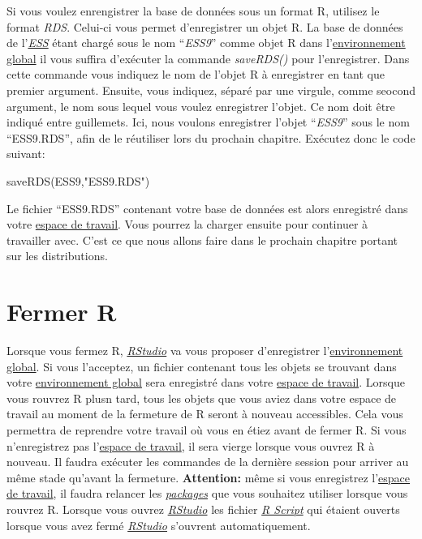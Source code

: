 \documentclass[
]{book}
\newenvironment{Shaded}{\begin{snugshade}}{\end{snugshade}}
\newcommand{\FunctionTok}[1]{\textcolor[rgb]{0.00,0.00,0.00}{#1}}
\newcommand{\NormalTok}[1]{#1}
\newcommand{\StringTok}[1]{\textcolor[rgb]{0.31,0.60,0.02}{#1}}
\begin{document}
Si vous voulez enrengistrer la base de données sous un format R, utilisez le format \emph{RDS}. Celui-ci vous permet d'enregistrer un objet R. La base de données de l'\href{https://www.europeansocialsurvey.org/}{\emph{ESS}} étant chargé sous le nom ``\emph{ESS9}'' comme objet R dans l'\protect\hyperlink{objets_envir}{environnement global} il vous suffira d'exécuter la commande \emph{saveRDS()} pour l'enregistrer. Dans cette commande vous indiquez le nom de l'objet R à enregistrer en tant que premier argument. Ensuite, vous indiquez, séparé par une virgule, comme seocond argument, le nom sous lequel vous voulez enregistrer l'objet. Ce nom doit être indiqué entre guillemets. Ici, nous voulons enregistrer l'objet ``\emph{ESS9}'' sous le nom ``ESS9.RDS'', afin de le réutiliser lors du prochain chapitre. Exécutez donc le code suivant:

\begin{Shaded}
\begin{Highlighting}[]
\FunctionTok{saveRDS}\NormalTok{(ESS9,}\StringTok{"ESS9.RDS"}\NormalTok{)}
\end{Highlighting}
\end{Shaded}

Le fichier ``ESS9.RDS'' contenant votre base de données est alors enregistré dans votre \protect\hyperlink{working_directory}{espace de travail}. Vous pourrez la charger ensuite pour continuer à travailler avec. C'est ce que nous allons faire dans le prochain chapitre portant sur les distributions.

\hypertarget{close_R}{%
\section{Fermer R}\label{close_R}}

Lorsque vous fermez R, \href{https://posit.co/}{\emph{RStudio}} va vous proposer d'enregistrer l'\protect\hyperlink{objets_envir}{environnement global}. Si vous l'acceptez, un fichier contenant tous les objets se trouvant dans votre \protect\hyperlink{objets_envir}{environnement global} sera enregistré dans votre \protect\hyperlink{working_directory}{espace de travail}. Lorsque vous rouvrez R plusn tard, tous les objets que vous aviez dans votre espace de travail au moment de la fermeture de R seront à nouveau accessibles. Cela vous permettra de reprendre votre travail où vous en étiez avant de fermer R. Si vous n'enregistrez pas l'\protect\hyperlink{working_directory}{espace de travail}, il sera vierge lorsque vous ouvrez R à nouveau. Il faudra exécuter les commandes de la dernière session pour arriver au même stade qu'avant la fermeture. \textbf{Attention:} même si vous enregistrez l'\protect\hyperlink{working_directory}{espace de travail}, il faudra relancer les \protect\hyperlink{packages}{\emph{packages}} que vous souhaitez utiliser lorsque vous rouvrez R. Lorsque vous ouvrez \href{https://posit.co/}{\emph{RStudio}} les fichier \protect\hyperlink{Commandes}{\emph{R Script}} qui étaient ouverts lorsque vous avez fermé \href{https://posit.co/}{\emph{RStudio}} s'ouvrent automatiquement.
\end{document}
